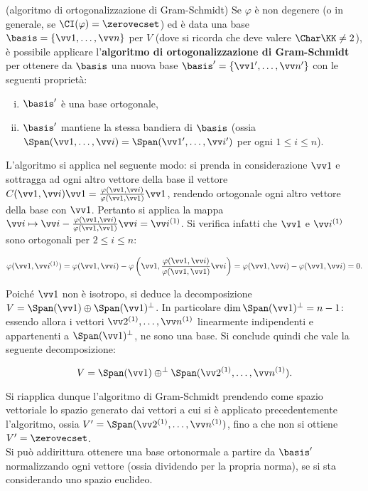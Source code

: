 \documentclass[11pt]{article}
\begin{document}
	\begin{remark} (algoritmo di ortogonalizzazione di Gram-Schmidt)
		Se $\varphi$ è non degenere (o in generale, se $\CI(\varphi) = \zerovecset$) ed è
		data una base $\basis = \{ \vv 1, \ldots, \vv n \}$ per $V$ (dove si ricorda che deve valere
		$\Char \KK \neq 2$), è possibile
		applicare l'\textbf{algoritmo di ortogonalizzazione di Gram-Schmidt} per ottenere
		da $\basis$ una nuova base $\basis' = \{ \vv 1', \ldots, \vv n' \}$ con le seguenti proprietà:
		
		\begin{enumerate}[(i)]
			\item $\basis'$ è una base ortogonale,
			\item $\basis'$ mantiene la stessa bandiera di $\basis$ (ossia $\Span(\vv 1, \ldots, \vv i) = \Span(\vv 1', \ldots, \vv i')$ per ogni $1 \leq i \leq n$).
		\end{enumerate}
	
		L'algoritmo si applica nel seguente modo: si prenda in considerazione $\vv 1$ e sottragga ad ogni altro vettore
		della base il vettore $C(\vv 1, \vv i) \vv 1 = \frac{\varphi(\vv 1, \vv i)}{\varphi(\vv 1, \vv 1)} \vv 1$,
		rendendo ortogonale ogni altro vettore della base con $\vv 1$. Pertanto si applica la mappa
		$\vv i \mapsto \vv i - \frac{\varphi(\vv 1, \vv i)}{\varphi(\vv 1, \vv 1)} \vv i = \vv i ^{(1)}$.
		Si verifica infatti che $\vv 1$ e $\vv i ^{(1)}$ sono ortogonali per $2 \leq i \leq n$:
		
		\[ \varphi(\vv 1, \vv i^{(1)}) = \varphi(\vv 1, \vv i) - \varphi\left(\vv 1, \frac{\varphi(\vv 1, \vv i)}{\varphi(\vv 1, \vv 1)} \vv i\right) = \varphi(\vv 1, \vv i) - \varphi(\vv 1, \vv i) = 0. \]
		
		Poiché $\vv 1$ non è isotropo, si deduce la decomposizione $V = \Span(\vv 1) \oplus \Span(\vv 1)^\perp$.
		In particolare $\dim \Span(\vv 1)^\perp = n-1$: essendo allora i vettori $\vv 2 ^{(1)}, \ldots, \vv n ^{(1)}$
		linearmente indipendenti e appartenenti a $\Span(\vv 1)^\perp$, ne sono una base. Si conclude quindi
		che vale la seguente decomposizione:
		
		\[ V = \Span(\vv 1) \oplus^\perp \Span(\vv 2 ^{(1)}, \ldots, \vv n ^{(1)}). \]
		
		\vskip 0.05in

		Si riapplica dunque l'algoritmo di Gram-Schmidt prendendo come spazio vettoriale lo spazio generato dai
		vettori a cui si è applicato precedentemente l'algoritmo, ossia $V' = \Span(\vv 2 ^{(1)}, \ldots, \vv n ^{(1)})$,
		fino a che non si ottiene $V' = \zerovecset$. \\
		
		Si può addirittura ottenere una base ortonormale a partire da $\basis'$ normalizzando ogni vettore (ossia
		dividendo per la propria norma), se si sta considerando uno spazio euclideo.
	\end{remark}
\end{document}
